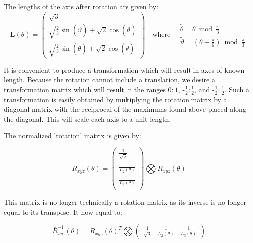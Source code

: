 The lengths of the axis after rotation are given by:
\begin{equation}\label{eq:L}
\mathbf{L}(\theta) = \left(
\begin{array}{c}
\sqrt{3} \\
 \sqrt{\frac{2}{3}} \sin \left(\widetilde{\vartheta}\right) + \sqrt{2} \cos \left(\widetilde{\vartheta}\right) \\  
\sqrt{\frac{2}{3}} \sin \left(\widetilde{\theta}\right) + \sqrt{2} \cos \left(\widetilde{\theta}\right) 
\end{array}
\right)
\quad \text{where}  \quad 
\begin{array}{c}
\widetilde{\theta} = \theta  \bmod \frac{\pi }{3} \\ 
\widetilde{\vartheta} = \left(\theta - \frac{\pi }{6}\right) \bmod \frac{\pi }{3}
\end{array}
\end{equation}

It is convenient to produce a transformation which will result in axes of known length. Because the rotation cannot include a translation, we desire a transformation matrix which will result in the ranges $0:1$, -$\frac{1}2:\frac{1}2$, and -$\frac{1}2:\frac{1}2$. Such a transformation is easily obtained by multiplying the rotation matrix by a diagonal matrix with the reciprocal of the maximums found above placed along the diagonal. This will scale each axis to a unit length.

The normalized 'rotation' matrix is given by:


\begin{equation}\label{eq:NormRxyz3}
 \overline{R}_{xyz}(\theta) =
\left(
\begin{array}{c}
 \frac{1}{\sqrt{3}}  \\
 \frac{1}{L_2(\theta)} \\
 \frac{1}{L_3(\theta) }  \\
\end{array}
\right)
\bigotimes
R_{xyz}(\theta)
\end{equation}

This matrix is no longer technically a rotation matrix as its inverse is no longer equal to its transpose. It now equal to:

\begin{equation}\label{eq:NormRxyz3Inverse}
 \overline{R}_{xyz}^{-1}(\theta) =
 R_{xyz}(\theta)^{T} \bigotimes
\left(
\begin{array}{ccc}
 \frac{1}{\sqrt{3}}  &
 \frac{1}{L_2(\theta)} &
 \frac{1}{L_3(\theta) }
\end{array}
\right)
\end{equation}

